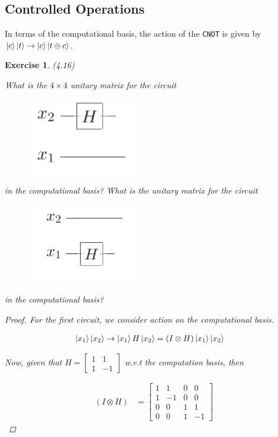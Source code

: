 \documentclass[11pt]{article}
\newcommand\0{\mathbf{0}}
\newcommand\<{\langle}
\renewcommand\>{\rangle}
\newtheorem{exercise}[theorem]{Exercise}
\begin{document}
\subsection{Controlled Operations} 

In terms of the computational basis, the action of the \texttt{CNOT} is given by $\ket{c}\ket{t} \rightarrow \ket{c} \ket{t \oplus c}$.

\begin{exercise}(4.16)

What is the $4\times 4$ unitary matrix for the circuit

\begin{figure}[H]
\centering
\includegraphics[width=.2\linewidth]{4_16-1.png}
\end{figure}

in the computational basis? What is the unitary matrix for the circuit

\begin{figure}[H]
\centering
\includegraphics[width=.25\linewidth]{4_16-2.png}
\end{figure}

in the computational basis?

\begin{proof}
	For the first circuit, we consider action on the computational basis.
	
	\begin{align*}
		\ket{x_1}\ket{x_2 } &\rightarrow \ket{x_1}H\ket{x_2} = (I \otimes H) \ket{x_1}\ket{x_2 }
	\end{align*}

Now, given that $H = \begin{bmatrix} 1 & 1 \\ 1 & -1\end{bmatrix}$ w.r.t the computation basis, then

\begin{align*}
	(I \otimes H) &= \begin{bmatrix}	
	1 & 1 & 0 & 0 \\
	1 & -1 & 0 & 0 \\
	0 & 0 & 1 & 1 \\
	0 & 0 & 1 & -1
 \end{bmatrix}
\end{align*}


\end{proof}
\end{exercise}
\end{document}
